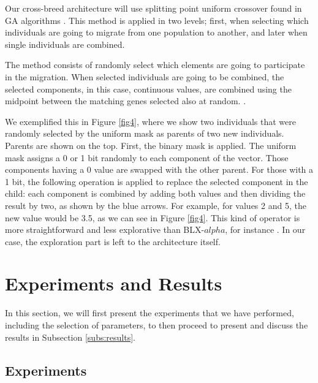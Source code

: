 \documentclass[runningheads]{llncs}
\begin{document}
Our cross-breed architecture will use splitting point uniform crossover found in GA
algorithms \cite{Kramer2014}. %
This method is applied in two levels; first, when selecting which
individuals are going to migrate from one population to another, and later when
single individuals are combined. 

The method consists of randomly select which elements 
are going to participate in the migration. When selected individuals are going to be
combined, the selected components, in this case, continuous values, are combined
using the midpoint between the matching genes selected also at random.
\cite{Kramer2017,Kaya2011}.

We exemplified this in Figure \ref{fig4}, where we show two individuals that
were randomly selected by the uniform mask as parents of two new individuals.
Parents are shown on the top. First, the binary mask is applied. The uniform
mask assigns a 0 or 1 bit randomly to each component of the vector. Those
components having a 0 value are swapped with the other parent. For those with a
1 bit, the following operation is applied to replace the selected component in
the child: each component is combined by adding both values and then dividing
the result by two, as shown by the blue arrows. For example, for values 2 and 5,
the new value would be 3.5, as we can see in Figure \ref{fig4}. This kind of
operator is more straightforward and less explorative than BLX-$alpha$, for
instance \cite{picek2013recombination}. In our case, the exploration part is
left to the architecture itself.

\section{Experiments and Results}
  \label{sec:exp}

  In this section, we will first present the experiments that we have performed,
  including the selection of parameters, to then proceed to present and discuss
  the results in Subsection \ref{subs:results}. 
    
  \subsection{Experiments}

\end{document}
